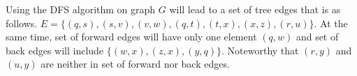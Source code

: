 Using the DFS algorithm on graph $G$ will lead to a set of tree edges that is as follows.
$E = \{(q,s), (s,v), (v,w), (q,t), (t,x), (x,z), (r,u)\}$. At the same time, set of forward edges will have only one element $(q,w)$ and set of back edges will include $\{(w,x), (z,x), (y,q)\}$. Noteworthy that $(r,y)$ and $(u,y)$ are neither in set of forward nor back edges.
